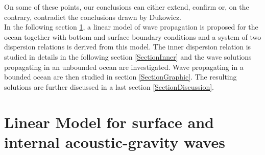 \documentclass[a4paper,11pt]{article}
\begin{document}
On some of these points, our conclusions can either extend, confirm or, on the contrary, contradict the conclusions drawn by Dukowicz.\\
In the following section \ref{SectionLinModels}, a linear model of wave propagation is proposed for the ocean together with bottom and surface boundary conditions and a system of two dispersion relations is derived from this model. The inner dispersion relation is studied in details in the following section \ref{SectionInner} and the wave solutions propagating in an unbounded ocean are investigated. Wave propagating in a bounded ocean are then studied in section \ref{SectionGraphic}. The resulting solutions are further discussed in a last section \ref{SectionDiscussion}.



\newpage
\section{Linear Model for surface and internal acoustic-gravity waves}
\label{SectionLinModels}
\end{document}
